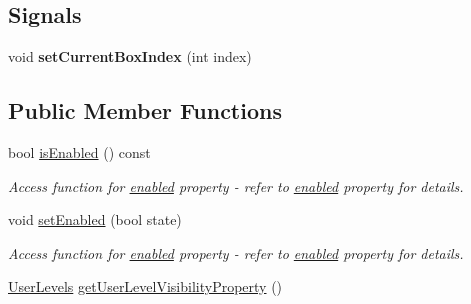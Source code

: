 \subsection*{Signals}
\begin{DoxyCompactItemize}
\item 
\hypertarget{classQEPvProperties_ad0df26e6cd54aaa3c3bf605f1805af95}{
void {\bfseries setCurrentBoxIndex} (int index)}
\label{classQEPvProperties_ad0df26e6cd54aaa3c3bf605f1805af95}

\end{DoxyCompactItemize}
\subsection*{Public Member Functions}
\begin{DoxyCompactItemize}
\item 
\hypertarget{classQEPvProperties_ae4c5b309bccdbab9f4f37fffdad5be80}{
bool \hyperlink{classQEPvProperties_ae4c5b309bccdbab9f4f37fffdad5be80}{isEnabled} () const }
\label{classQEPvProperties_ae4c5b309bccdbab9f4f37fffdad5be80}

\begin{DoxyCompactList}\small\item\em Access function for \hyperlink{classQEPvProperties_a89fe9ff0954fac3081a0f5dd3493a98b}{enabled} property -\/ refer to \hyperlink{classQEPvProperties_a89fe9ff0954fac3081a0f5dd3493a98b}{enabled} property for details. \end{DoxyCompactList}\item 
\hypertarget{classQEPvProperties_a6629d197b20a0c52a075735bb1c3b248}{
void \hyperlink{classQEPvProperties_a6629d197b20a0c52a075735bb1c3b248}{setEnabled} (bool state)}
\label{classQEPvProperties_a6629d197b20a0c52a075735bb1c3b248}

\begin{DoxyCompactList}\small\item\em Access function for \hyperlink{classQEPvProperties_a89fe9ff0954fac3081a0f5dd3493a98b}{enabled} property -\/ refer to \hyperlink{classQEPvProperties_a89fe9ff0954fac3081a0f5dd3493a98b}{enabled} property for details. \end{DoxyCompactList}\item 
\hypertarget{classQEPvProperties_a96a8d926dab1cf3473ce512e6e306ed2}{
\hyperlink{classQEPvProperties_affb354a03ed5e2905586fad96fd9cb32}{UserLevels} \hyperlink{classQEPvProperties_a96a8d926dab1cf3473ce512e6e306ed2}{getUserLevelVisibilityProperty} ()}
\label{classQEPvProperties_a96a8d926dab1cf3473ce512e6e306ed2}


\end{DoxyCompactItemize}
